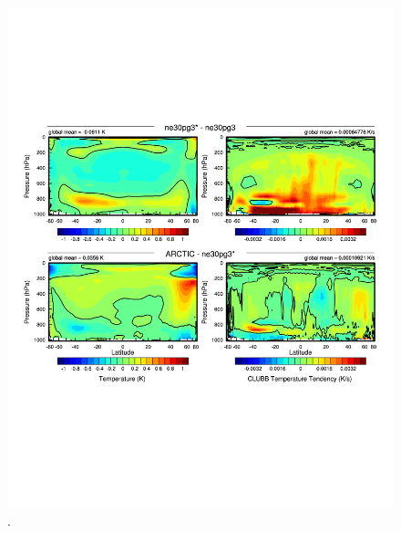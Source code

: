 \documentclass[draft]{agujournal2019}
\begin{document}
\begin{figure}[t]
\begin{center}
         \includegraphics[width=130mm]{figs/temp_dhgt_panel_STEND_CLUBB-hires.pdf}
\end{center}
\caption{.}
\label{fig:dT-hires}
\end{figure}
\end{document}
